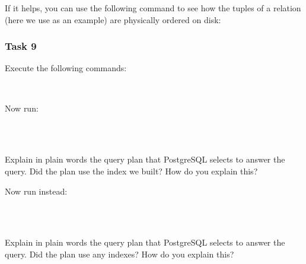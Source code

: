 \vgap

\noindent If it helps, you can use the following command to see how the tuples of a relation (here we use  as an example) are physically ordered on disk:

\vgap

\noindent {}

\subsubsection{Task 9}

Execute the following commands:

\vgap

\noindent {} \\
\noindent {}

\vgap

\noindent Now run:

\vgap

\noindent {} \\
 \\

\vgap

\noindent Explain in plain words the query plan that PostgreSQL selects to answer the query. Did the plan use the index  we built? How do you explain this?

\vgap

\noindent Now run instead:

\vgap

\noindent {} \\
 \\

\vgap

\noindent Explain in plain words the query plan that PostgreSQL selects to answer the query. Did the plan use any indexes? How do you explain this?


